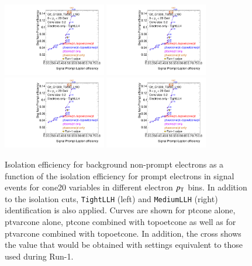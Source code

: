 \begin{figure}[phtb!]
\begin{center}
\includegraphics[page=7,width=0.4\textwidth]{FIGURES/ISOLATION/isoEl.pdf}
\includegraphics[page=8,width=0.4\textwidth]{FIGURES/ISOLATION/isoEl.pdf}
\includegraphics[page=9,width=0.4\textwidth]{FIGURES/ISOLATION/isoEl.pdf}
\includegraphics[page=10,width=0.4\textwidth]{FIGURES/ISOLATION/isoEl.pdf}
\end{center}
\vspace{-0.2cm}
\caption{Isolation efficiency for background non-prompt electrons as a function of the isolation efficiency for prompt electrons in signal events for cone20 variables in different electron $p_{\mathrm{T}}$ bins. In addition to the isolation cuts, {\tt TightLLH} (left) and {\tt MediumLLH} (right) identification is also applied. Curves are shown for ptcone alone, ptvarcone alone, ptcone combined with topoetcone as well as for ptvarcone combined with topoetcone. In addition, the cross shows the value that would be obtained with settings equivalent to those used during Run-1.}
\label{fig:isoEl3}
\end{figure}


